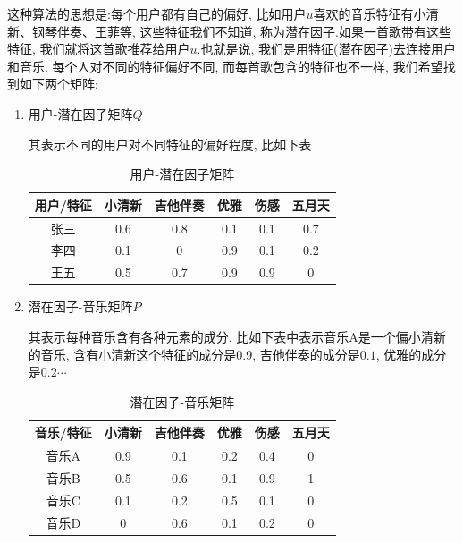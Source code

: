 \documentclass[a4paper,UTF8]{ctexart}
\theoremstyle{plain} \newtheorem{theorem}{定理}[section]
\theoremstyle{plain} \newtheorem{definition}{定义}[section]
\theoremstyle{plain} \newtheorem{lemma}{引理}[section]
\theoremstyle{plain} \newtheorem{proposition}{命题}[section]
\theoremstyle{plain} \newtheorem{example}{例}[section]
\theoremstyle{plain} \newtheorem{remark}{注}[section]
\theoremstyle{plain} \newtheorem{corollary}{推论}[section]
\begin{document}
这种算法的思想是:每个用户都有自己的偏好, 比如用户$u$喜欢的音乐特征有小清新、钢琴伴奏、王菲等, 这些特征我们不知道, 称为潜在因子.如果一首歌带有这些特征, 我们就将这首歌推荐给用户$u$.也就是说, 我们是用特征(潜在因子)去连接用户和音乐. 每个人对不同的特征偏好不同, 而每首歌包含的特征也不一样, 我们希望找到如下两个矩阵:
\begin{enumerate}[(1)]
\item 用户-潜在因子矩阵$Q$

其表示不同的用户对不同特征的偏好程度, 比如下表
\begin{table}[!htb]
\centering
\caption{用户-潜在因子矩阵}
\label{userfator}
\begin{tabular}{c|c|c|c|c|c}
  \hline
    \textbf{用户/特征} & \textbf{小清新} & \textbf{吉他伴奏} & \textbf{优雅} & \textbf{伤感}  & \textbf{五月天} \\
    \hline
    张三  & 0.6 & 0.8 & 0.1 & 0.1 & 0.7 \\
    \hline
    李四  & 0.1 & 0   & 0.9 & 0.1 & 0.2 \\
    \hline
    王五  & 0.5 & 0.7 & 0.9 & 0.9 & 0   \\
  \hline
\end{tabular}
\end{table}

\item 潜在因子-音乐矩阵$P$

其表示每种音乐含有各种元素的成分, 比如下表中表示音乐A是一个偏小清新的音乐, 含有小清新这个特征的成分是$0.9$, 吉他伴奏的成分是$0.1$, 优雅的成分是$0.2 \cdots$
\begin{table}[!htb]
\centering
\caption{潜在因子-音乐矩阵}
\label{fatoritem}
\begin{tabular}{c|c|c|c|c|c}
  \hline
    \textbf{音乐/特征} & \textbf{小清新} & \textbf{吉他伴奏} & \textbf{优雅} & \textbf{伤感} & \textbf{五月天} \\
    \hline
    音乐A & 0.9 & 0.1 & 0.2 & 0.4 & 0 \\
    \hline
    音乐B & 0.5 & 0.6 & 0.1 & 0.9 & 1 \\
    \hline
    音乐C & 0.1 & 0.2 & 0.5 & 0.1 & 0 \\
    \hline
    音乐D & 0   & 0.6 & 0.1 & 0.2 & 0 \\ 
  \hline
\end{tabular}
\end{table}


\end{enumerate}
\end{document}
